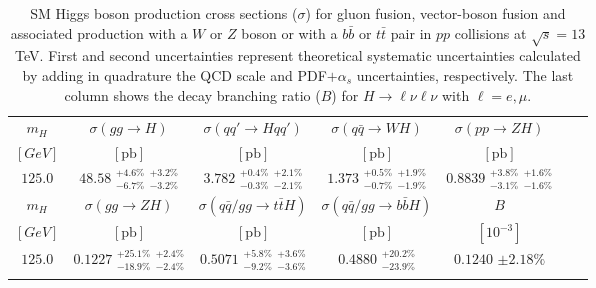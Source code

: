 \begin{table}[tb]
 \centering
 \caption{SM Higgs boson production cross sections ($\sigma$) for gluon fusion, vector-boson fusion and associated production with a $W$ or $Z$ boson or with a $b\bar{b}$ or $t\bar{t}$ pair in $pp$ collisions at $\sqrt{s}=13$ TeV. First and second uncertainties represent theoretical systematic uncertainties calculated by adding in quadrature the QCD scale and PDF$+\alpha_s$ uncertainties, respectively. The last column shows the decay branching ratio ($B$) for $H \rightarrow \ell\nu\ell\nu$ with $\ell = e, \mu$.\label{tab:MCSignal}}
 \vspace{0.1cm}
 \begin{tabular}{ccccccc}
   \hline \hline
   \noalign{\vspace{0.05cm}}
   $m_{H}$       & $\sigma\left(gg\to H\right)$ & $\sigma\left(qq'\to Hqq'\right)$ & $\sigma\left(q\bar{q}\to WH\right)$ & $\sigma\left(pp\to ZH\right)$   \\
   $[{GeV}]$ & $[{\textrm{pb}}]$                 & $[{\textrm{pb}}]$                     &  $[{\textrm{pb}}]$                       & $[{\textrm{pb}}]$                    \\
   \noalign{\vspace{0.05cm}}
   \hline\hline
   \noalign{\vspace{0.05cm}}
   
   $125.0$\rule[-1mm]{0mm}{4.7mm} & $48.58$  $^{+4.6\%}_{-6.7\%}$ $^{+3.2\%}_{-3.2\%}$ & $3.782$  $^{+0.4\%}_{-0.3\%}$ $^{+2.1\%}_{-2.1\%}$ & $1.373$  $^{+0.5\%}_{-0.7\%}$ $^{+1.9\%}_{-1.9\%}$  
                                  & $0.8839$ $^{+3.8\%}_{-3.1\%}$ $^{+1.6\%}_{-1.6\%}$ \\
  
   \noalign{\vspace{0.05cm}}
   \hline\hline 
   \noalign{\vspace{0.05cm}}
   $m_{H}$       & $\sigma\left(gg\to ZH\right)$ & $\sigma\left(q\bar{q}/gg\to t\bar{t}H\right)$ & $\sigma\left(q\bar{q}/gg\to b\bar{b}H\right)$ & $B$  \\ 
   $[{GeV}]$ & $[{\textrm{pb}}]$                  & $[{\textrm{pb}}]$                                  & $[{\textrm{pb}}]$                                 & $[10^{-3}]$\\
   \noalign{\vspace{0.05cm}}
   \hline\hline
   \noalign{\vspace{0.05cm}}
    $125.0$\rule[-1mm]{0mm}{4.7mm} & $0.1227$ $^{+25.1\%}_{-18.9\%}$ $^{+2.4\%}_{-2.4\%}$ & $0.5071$ $^{+5.8\%}_{-9.2\%}$ $^{+3.6\%}_{-3.6\%}$ & $0.4880$ $^{+20.2\%}_{-23.9\%}$ & $0.1240$ $\pm2.18\%$ \\
   \noalign{\vspace{0.05cm}}
   \hline\hline
 \end{tabular}
\end{table}  

